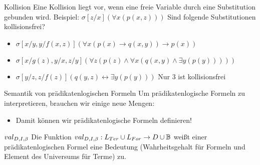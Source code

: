 \documentclass[handout]{beamer}
\begin{document}
\begin{frame}{Kollision}
Eine Kollision liegt vor, wenn eine freie Variable durch eine Substitution gebunden wird. \pause \newline
Beispiel: $\sigma[z/x] (\forall x (p(x, z)))$ \pause \newline
Sind folgende Substitutionen kollisionsfrei?
\begin{itemize}
	\item $\sigma[x/y, y/f(x,z)](\forall x(p(x) \rightarrow q(x,y)) \rightarrow p(x))$
	\item $\sigma[x/g(z), y/x, z/y](\forall z(p(z) \land \forall x(q(x,y) \land \exists y (p(y)))))$
	\item $\sigma[y/z, z/f(z)](q(y,z) \leftrightarrow \exists y(p(y)))$
	\pitem Nur 3 ist kollisionsfrei
\end{itemize}
\end{frame}


\begin{frame}{Semantik von prädikatenlogischen Formeln}
	Um prädikatenlogische Formeln zu interpretieren, brauchen wir einige neue Mengen:
	
	\begin{itemize}
		\pitem Interpretation $(D, I)$\ip, bestehend aus...
		\begin{itemize}
			\pitem Universum $D \neq \emptyset$ mit...
			\begin{itemize}
				\pitem $I(c_i) \in D$ für $c_i \in Const_{PL}$
				\pitem $I(f_i) : D^{ar(f_i)} \rightarrow D$ für $f_i \in Fun_{PL}$
				\pitem $I(R_i) \subseteq D^{ar(R_i)}$ für $R_i \in Rel_{PL}$
				\pitem $I$ weißt also den Komponenten Bedeutungen zu, ``definiert diese''
			\end{itemize}
			
			\pitem Variablenbelegung $\sigma : Var_{PL} \rightarrow D$, z.B. $\sigma(x) := 3, \sigma(y) := 11$
			\begin{itemize}
				\pitem $\sigma$ definiert also Variablenwerte
			\end{itemize}
		\end{itemize}
		
		\bp
		
		\item Damit können wir prädikatenlogische Formeln definieren!
	\end{itemize}
	
	\p
	
	\begin{block}{$val_{D,I,\beta}$}
		Die Funktion $val_{D,I,\beta} : L_{Ter} \cup L_{For} \rightarrow D \cup \mathbb{B}$ weißt einer prädikatenlogischen Formel eine Bedeutung 
		(Wahrheitsgehalt für Formeln und Element des Universums für Terme) zu.
	\end{block}
\end{frame}
\end{document}
